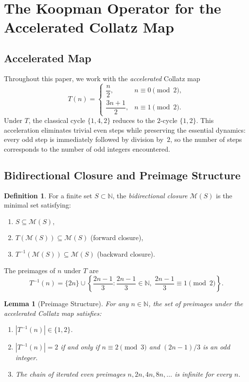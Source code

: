 \documentclass[12pt,a4paper]{article}
\newtheorem{lemma}[theorem]{Lemma}
\theoremstyle{definition}
\newtheorem{definition}[theorem]{Definition}
\theoremstyle{remark}
\begin{document}
\section{The Koopman Operator for the Accelerated Collatz Map}

\subsection{Accelerated Map}

Throughout this paper, we work with the \emph{accelerated} Collatz
map
\[
T(n)=
\begin{cases}
\dfrac{n}{2},                & n\equiv0\pmod2,\\[12pt]
\dfrac{3n+1}{2},             & n\equiv1\pmod2.
\end{cases}
\]
Under $T$, the classical cycle $\{1,4,2\}$ reduces to the $2$-cycle
$\{1,2\}$.
This acceleration eliminates trivial even steps while preserving the
essential dynamics: every odd step is immediately followed by division
by~$2$, so the number of steps corresponds to the number of odd
integers encountered.

\subsection{Bidirectional Closure and Preimage Structure}

\begin{definition}\label{def:closure}
For a finite set $S\subset\mathbb N$, the \emph{bidirectional closure}
$\mathcal M(S)$ is the minimal set satisfying:
\begin{enumerate}
\item $S\subseteq\mathcal M(S)$,
\item $T(\mathcal M(S))\subseteq\mathcal M(S)$ (forward closure),
\item $T^{-1}(\mathcal M(S))\subseteq\mathcal M(S)$ (backward closure).
\end{enumerate}
The preimages of $n$ under $T$ are
\[
T^{-1}(n)=\{2n\}\cup
\left\{\frac{2n-1}{3}:
\frac{2n-1}{3}\in\mathbb N,\;
\frac{2n-1}{3}\equiv1\pmod2\right\}.
\]
\end{definition}

\begin{lemma}[Preimage Structure]\label{lem:preimage}
For any $n\in\mathbb N$, the set of preimages under the accelerated
Collatz map satisfies:
\begin{enumerate}
\item $|T^{-1}(n)|\in\{1,2\}$.
\item $|T^{-1}(n)|=2$ if and only if $n\equiv2\pmod3$ and
      $(2n-1)/3$ is an odd integer.
\item The chain of iterated even preimages $n,2n,4n,8n,\dots$ is
      infinite for every $n$.
\end{enumerate}
\end{lemma}
\end{document}
